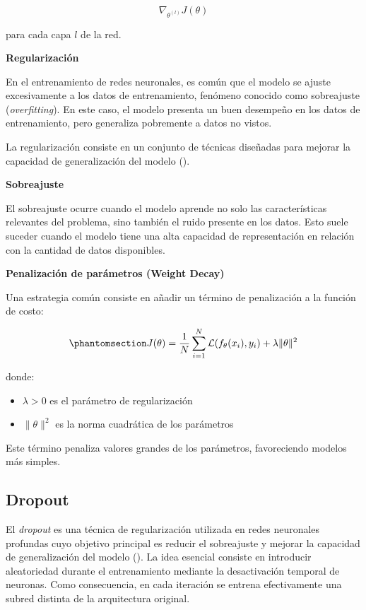 \documentclass[
  spanish,
  us-letterpaper,
]{scrreprt}
\providecommand{\tightlist}{%
  \setlength{\itemsep}{0pt}\setlength{\parskip}{0pt}}
\theoremstyle{definition}
\theoremstyle{remark}
\begin{document}
\[
\nabla_{\theta^{(l)}} J(\theta)
\]

para cada capa \(l\) de la red.

\textbf{Regularización}

En el entrenamiento de redes neuronales, es común que el modelo se
ajuste excesivamente a los datos de entrenamiento, fenómeno conocido
como sobreajuste (\emph{overfitting}). En este caso, el modelo presenta
un buen desempeño en los datos de entrenamiento, pero generaliza
pobremente a datos no vistos.

La regularización consiste en un conjunto de técnicas diseñadas para
mejorar la capacidad de generalización del modelo
().

\textbf{Sobreajuste}

El sobreajuste ocurre cuando el modelo aprende no solo las
características relevantes del problema, sino también el ruido presente
en los datos. Esto suele suceder cuando el modelo tiene una alta
capacidad de representación en relación con la cantidad de datos
disponibles.

\textbf{Penalización de parámetros (Weight Decay)}

Una estrategia común consiste en añadir un término de penalización a la
función de costo:

\begin{equation}\phantomsection\label{eq-weight-decay}{
J(\theta) = \frac{1}{N} \sum_{i=1}^{N} \mathcal{L}(f_\theta(x_i), y_i) + \lambda \|\theta\|^2
}\end{equation}

donde:

\begin{itemize}
\tightlist
\item
  \(\lambda > 0\) es el parámetro de regularización
\item
  \(\|\theta\|^2\) es la norma cuadrática de los parámetros
\end{itemize}

Este término penaliza valores grandes de los parámetros, favoreciendo
modelos más simples.

\subsection{Dropout}\label{dropout}

El \emph{dropout} es una técnica de regularización utilizada en redes
neuronales profundas cuyo objetivo principal es reducir el sobreajuste y
mejorar la capacidad de generalización del modelo
(). La idea
esencial consiste en introducir aleatoriedad durante el entrenamiento
mediante la desactivación temporal de neuronas. Como consecuencia, en
cada iteración se entrena efectivamente una subred distinta de la
arquitectura original.
\end{document}

